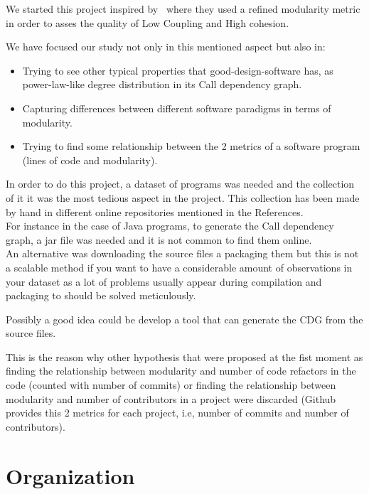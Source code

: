 \documentclass[12pt, a4paper]{article}
\begin{document}
We started this project inspired by~\cite{cohesion_coupling} where they used a refined modularity metric in order to asses the quality of Low Coupling and High cohesion.

We have focused our study not only in this mentioned aspect but also in:

\begin{itemize}
  \item Trying to see other typical properties that good-design-software has, as power-law-like degree distribution in its Call dependency graph.
  \item Capturing differences between different software paradigms in terms of modularity.
  \item Trying to find some relationship between the 2 metrics of a software program (lines of code and modularity).
\end{itemize}

In order to do this project, a dataset of programs was needed and the collection of it it was the most tedious aspect in the project. This collection has been made by hand in different online repositories mentioned in the References. \\
For instance in the case of Java programs, to generate the Call dependency graph, a jar file was needed and it is not common to find them online.\\ An alternative was downloading the source files a packaging them but this is not a scalable method if you want to have a considerable amount of observations in your dataset as a lot of problems usually appear during compilation and packaging to should be solved meticulously. 

Possibly a good idea could be develop a tool that can generate the CDG from the source files.

This is the reason why other hypothesis that were proposed at the fist moment as finding the relationship between modularity and number of code refactors in the code (counted with number of commits) or finding the relationship between modularity and number of contributors in a project were discarded (Github provides this 2 metrics for each project, i.e, number of commits and number of contributors).




\appendix
\section{Organization}\label{apx:sec:org:1}
\end{document}
